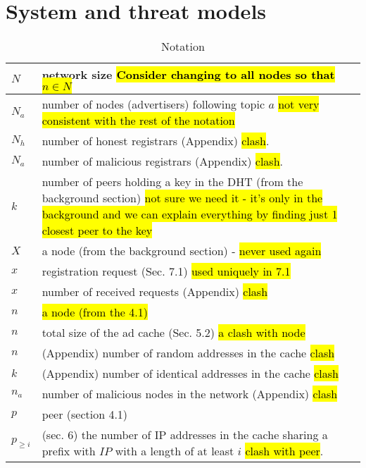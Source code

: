 
\section{System and threat models}
\label{sec:model}

\begin{table*}
    \caption{Notation}
    \label{tab:notation}
\begin{center}
    \begin{tabular}{ | l | p{16cm} |}
      \hline
        $N$ & network size \hl{Consider changing to all nodes so that $n \in N$} \\ \hline
        $N_a$ & number of nodes (advertisers) following topic $a$ \hl{not very consistent with the rest of the notation}\\ \hline
        $N_h$ & number of honest registrars (Appendix) \hl{clash}. \\ \hline
        $N_a$ & number of malicious registrars (Appendix) \hl{clash}. \\ \hline
        $k$ & number of peers holding a key in the DHT (from the background section) \hl{not sure we need it - it's only in the background and we can explain everything by finding just 1 closest peer to the key} \\ \hline
        $X$ & a node (from the background section) - \hl{never used again} \\ \hline
        $x$ & registration request (Sec. 7.1) \hl{used uniquely in 7.1} \\ \hline
        $x$ & number of received requests (Appendix) \hl{clash} \\ \hline
        $n$ & \hl{a node (from the 4.1)} \\ \hline
        $n$ & total size of the ad cache (Sec. 5.2) \hl{a clash with node} \\ \hline
        $n$ & (Appendix) number of random addresses in the cache \hl{clash }\\ \hline
        $k$ & (Appendix) number of identical addresses in the cache \hl{clash }\\ \hline
        $n_a$ & number of malicious nodes in the network (Appendix) \hl{clash} \\ \hline
        $p$ & peer (section 4.1) \\ \hline
        $p_{\geq i}$ & (sec. 6) the number of IP addresses in the cache sharing a prefix with $IP$ with a length of at least $i$ \hl{clash with peer}. \\ \hline

\end{tabular}
\end{center}
\end{table*}
